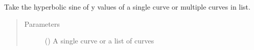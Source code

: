 \documentclass[letterpaper,10pt,english]{sphinxmanual}
\begin{document}
\begin{fulllineitems}
\label{\detokenize{pydv:pydvpy.sinh}}
Take the hyperbolic sine of y values of a single curve or multiple curves in list.

\begin{sphinxVerbatim}[commandchars=\\\{\}]
  
\end{sphinxVerbatim}

\begin{sphinxVerbatim}[commandchars=\\\{\}]
\end{sphinxVerbatim}
\begin{quote}\begin{description}
\item[{Parameters}] \leavevmode
{} () \textendash{} A single curve or a list of curves

\end{description}\end{quote}

\end{fulllineitems}

\end{document}
